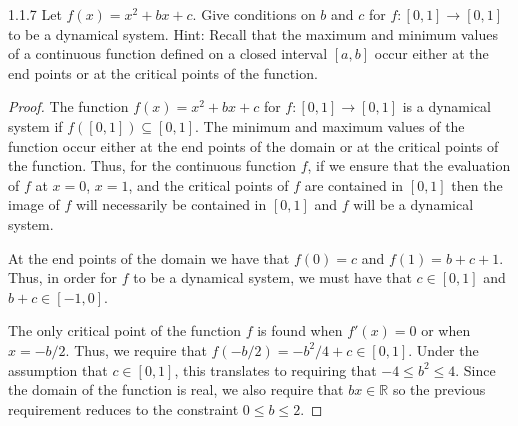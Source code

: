 \begin{problem}{1.1.7}
  Let $f(x) = x^2 + bx + c$. Give conditions on $b$ and $c$ for $f: [0, 1] \to [0, 1]$
  to be a dynamical system. Hint: Recall that the maximum and minimum values of
  a continuous function defined on a closed interval $[a, b]$ occur either at
  the end points or at the critical points of the function.
\end{problem}

\begin{proof}
  The function $f(x) = x^2 + bx + c$ for $f: [0, 1] \to [0, 1]$ is a dynamical
  system if $f([0,1]) \subseteq [0,1]$. The minimum and maximum values of the function occur either at the end points of
  the domain or at the critical points of the function. Thus, for the continuous
  function $f$, if we ensure that the evaluation of $f$ at $x=0$, $x=1$, and
  the critical points of $f$ are contained in $[0, 1]$ then the image of $f$ will necessarily
  be contained in $[0, 1]$ and $f$ will be a dynamical system.

  At the end points of the domain we have that $f(0) = c$ and $f(1) = b + c + 1$. Thus, in order for $f$ to be
  a dynamical system, we must have that $c \in [0, 1]$ and $b + c \in [-1, 0]$.

  The only critical point of the function $f$ is found when $f'(x) = 0$ or when $x = -b/2$.
  Thus, we require that $f(-b/2) = -b^2/4 + c \in [0, 1]$. Under the assumption
  that $c\in[0, 1]$, this translates to requiring that $-4 \leq b^2 \leq 4$. Since the domain of the function is real,
  we also require that $bx \in \mathbb{R}$  so the previous requirement reduces to
  the constraint $0 \leq b \leq 2$.

\end{proof}
\newpage
